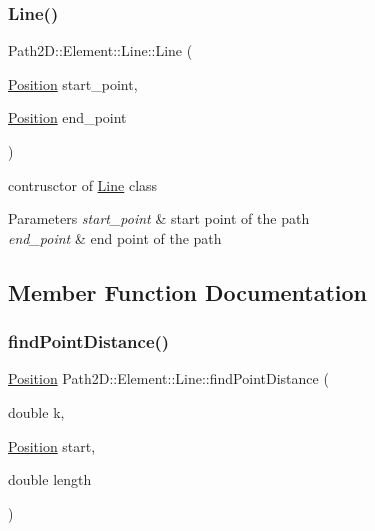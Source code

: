 \subsubsection{\texorpdfstring{Line()}{Line()}}
{\footnotesize\ttfamily Path2\+D\+::\+Element\+::\+Line\+::\+Line (\begin{DoxyParamCaption}\item[{\mbox{\hyperlink{class_path2_d_1_1_element_1_1_position}{Position}}}]{start\+\_\+point,  }\item[{\mbox{\hyperlink{class_path2_d_1_1_element_1_1_position}{Position}}}]{end\+\_\+point }\end{DoxyParamCaption})}



contrusctor of \mbox{\hyperlink{class_path2_d_1_1_element_1_1_line}{Line}} class 


\begin{DoxyParams}{Parameters}
{\em start\+\_\+point} & start point of the path \\
\hline
{\em end\+\_\+point} & end point of the path \\
\hline
\end{DoxyParams}


\subsection{Member Function Documentation}
\mbox{\label{class_path2_d_1_1_element_1_1_line_a375516699c55aee53a48ba9c3e819da8}} 
\subsubsection{\texorpdfstring{find\+Point\+Distance()}{findPointDistance()}}
{\footnotesize\ttfamily \mbox{\hyperlink{class_path2_d_1_1_element_1_1_position}{Position}} Path2\+D\+::\+Element\+::\+Line\+::find\+Point\+Distance (\begin{DoxyParamCaption}\item[{double}]{k,  }\item[{\mbox{\hyperlink{class_path2_d_1_1_element_1_1_position}{Position}}}]{start,  }\item[{double}]{length }\end{DoxyParamCaption})}




